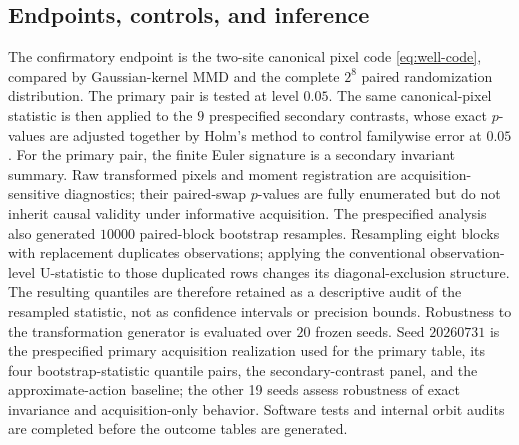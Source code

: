 \documentclass[11pt]{article}
\theoremstyle{definition}
\theoremstyle{remark}
\newcommand{\1}{\mathbf 1}
\providecommand{\RxReplicationPairs}{9}
\providecommand{\RxConfirmationBlocks}{8}
\providecommand{\RxBootstrapReplicates}{10000}
\providecommand{\RxNuisanceSeeds}{20}
\begin{document}
\subsection{Endpoints, controls, and inference}

The confirmatory endpoint is the two-site canonical pixel code
\eqref{eq:well-code}, compared by Gaussian-kernel MMD and the complete
\(2^{\RxConfirmationBlocks}\) paired randomization distribution.  The primary
pair is tested at level \(0.05\).  The same canonical-pixel statistic is then
applied to the \(\RxReplicationPairs\) prespecified secondary contrasts, whose
exact \(p\)-values are adjusted together by Holm's method to control familywise
error at \(0.05\).  For the primary pair, the finite Euler signature is a
secondary invariant summary.  Raw transformed pixels and moment registration
are acquisition-sensitive diagnostics; their paired-swap \(p\)-values are
fully enumerated but do not inherit causal validity under informative
acquisition.  The prespecified analysis also generated
\(\RxBootstrapReplicates\) paired-block bootstrap resamples.  Resampling eight
blocks with replacement duplicates observations; applying the conventional
observation-level U-statistic to those duplicated rows changes its
diagonal-exclusion structure.  The resulting quantiles are therefore retained
as a descriptive audit of the resampled statistic, not as confidence intervals
or precision bounds.  Robustness to the transformation
generator is evaluated over \(\RxNuisanceSeeds\) frozen seeds.  Seed
\(20260731\) is the prespecified primary acquisition realization used for the
primary table, its four bootstrap-statistic quantile pairs, the secondary-contrast panel, and
the approximate-action baseline; the other 19 seeds assess robustness of exact
invariance and acquisition-only behavior.  Software tests
and internal orbit audits are completed before the outcome tables are
generated.
\end{document}
